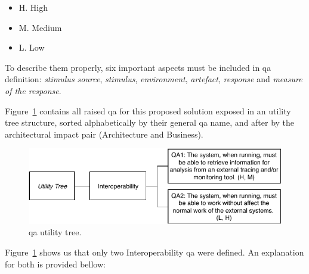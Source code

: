 \begin{itemize}
    \item H. High
    \item M. Medium
    \item L. Low
\end{itemize}

To describe them properly, six important aspects must be included in \gls{qa} definition: \emph{stimulus source}, \emph{stimulus}, \emph{environment}, \emph{artefact}, \emph{response} and \emph{measure of the response}.

Figure~\ref{fig:utility_tree} contains all raised \gls{qa} for this proposed solution exposed in an utility tree structure, sorted alphabetically by their general \gls{qa} name, and after by the architectural impact pair (Architecture and Business).

\begin{figure}[H]
    \centering
    \includegraphics[width=1.00\textwidth]{images/utility_tree.pdf}
    \caption{\gls{qa} utility tree.}
    \label{fig:utility_tree}
\end{figure}

Figure~\ref{fig:utility_tree} shows us that only two Interoperability \gls{qa} were defined. An explanation for both is provided bellow:

